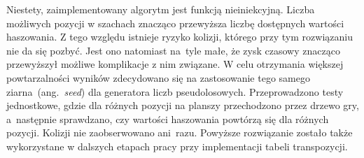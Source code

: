 Niestety, zaimplementowany algorytm jest funkcją nieiniekcyjną.
Liczba możliwych pozycji w szachach znacząco przewyższa liczbę dostępnych wartości haszowania.
Z tego względu istnieje ryzyko kolizji, którego przy tym rozwiązaniu nie da się pozbyć.
Jest ono natomiast na~tyle małe, że zysk czasowy znacząco przewyższył możliwe komplikacje z nim związane.
W celu otrzymania większej powtarzalności wyników zdecydowano się na zastosowanie tego samego ziarna~(ang.~\emph{seed}) dla generatora liczb pseudolosowych.
Przeprowadzono testy jednostkowe, gdzie dla różnych pozycji na planszy przechodzono przez drzewo gry, a~następnie sprawdzano, czy wartości haszowania powtórzą się dla różnych pozycji.
Kolizji nie zaobserwowano ani~razu.
Powyższe rozwiązanie zostało także wykorzystane w dalszych etapach pracy przy implementacji tabeli transpozycji.




